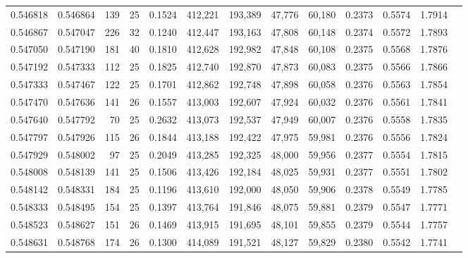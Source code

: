 \begin{tabular}{rrrrrrrrrrrrr}
0.546818 & 0.546864 &   139 &  25 &                                     0.1524 & 412,221 & 193,389 &  47,776 &  60,180 & 0.2373 & 0.5574 & 1.7914 \\
0.546867 & 0.547047 &   226 &  32 &                                     0.1240 & 412,447 & 193,163 &  47,808 &  60,148 & 0.2374 & 0.5572 & 1.7893 \\
0.547050 & 0.547190 &   181 &  40 &                                     0.1810 & 412,628 & 192,982 &  47,848 &  60,108 & 0.2375 & 0.5568 & 1.7876 \\
0.547192 & 0.547333 &   112 &  25 &                                     0.1825 & 412,740 & 192,870 &  47,873 &  60,083 & 0.2375 & 0.5566 & 1.7866 \\
0.547333 & 0.547467 &   122 &  25 &                                     0.1701 & 412,862 & 192,748 &  47,898 &  60,058 & 0.2376 & 0.5563 & 1.7854 \\
0.547470 & 0.547636 &   141 &  26 &                                     0.1557 & 413,003 & 192,607 &  47,924 &  60,032 & 0.2376 & 0.5561 & 1.7841 \\
0.547640 & 0.547792 &    70 &  25 &                                     0.2632 & 413,073 & 192,537 &  47,949 &  60,007 & 0.2376 & 0.5558 & 1.7835 \\
0.547797 & 0.547926 &   115 &  26 &                                     0.1844 & 413,188 & 192,422 &  47,975 &  59,981 & 0.2376 & 0.5556 & 1.7824 \\
0.547929 & 0.548002 &    97 &  25 &                                     0.2049 & 413,285 & 192,325 &  48,000 &  59,956 & 0.2377 & 0.5554 & 1.7815 \\
0.548008 & 0.548139 &   141 &  25 &                                     0.1506 & 413,426 & 192,184 &  48,025 &  59,931 & 0.2377 & 0.5551 & 1.7802 \\
0.548142 & 0.548331 &   184 &  25 &                                     0.1196 & 413,610 & 192,000 &  48,050 &  59,906 & 0.2378 & 0.5549 & 1.7785 \\
0.548333 & 0.548495 &   154 &  25 &                                     0.1397 & 413,764 & 191,846 &  48,075 &  59,881 & 0.2379 & 0.5547 & 1.7771 \\
0.548523 & 0.548627 &   151 &  26 &                                     0.1469 & 413,915 & 191,695 &  48,101 &  59,855 & 0.2379 & 0.5544 & 1.7757 \\
0.548631 & 0.548768 &   174 &  26 &                                     0.1300 & 414,089 & 191,521 &  48,127 &  59,829 & 0.2380 & 0.5542 & 1.7741 \\

\end{tabular}
